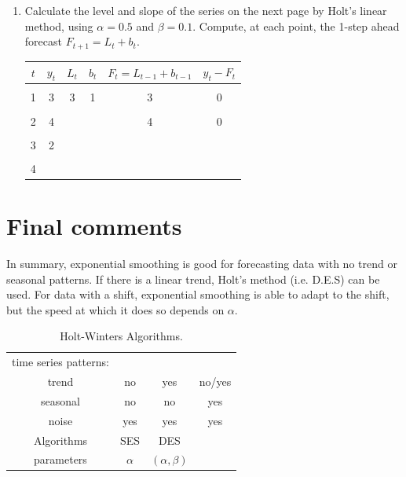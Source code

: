 \documentclass[a4paper,11pt,oneside,onecolumn]{book}
\begin{document}
\begin{enumerate}
\item Calculate the level and slope of the series on
the next page by Holt's linear method, using $\alpha = 0.5$ and
$\beta = 0.1$. Compute, at each point, the 1-step ahead forecast
$F_{t+1} = L_t + b_t$.

\begin{center}
\begin{tabular}{|c|c|cc|cc|}
\multicolumn{1}{|c|}{$t$} & \multicolumn{1}{c|}{$y_t$} &
\multicolumn{1}{p{3cm}}{\hspace{1.2cm}$L_t$} &
\multicolumn{1}{p{2cm}|}{\hspace{.6cm}$b_t$} &
\multicolumn{1}{p{3cm}}{\hspace{.5cm}$F_{t} = L_{t-1}+b_{t-1}$} &
\multicolumn{1}{p{2cm}|}{\hspace{.3cm} $y_t - F_t$} \\
\hline
  &       &   &   &   &   \\
1 & 3     & 3 & 1 & 3 & 0 \\
  &       &   &   &   &   \\
2 & 4     &   &   & 4 & 0  \\
  &       &   &   &   &   \\
3 & 2     &   &   &   &   \\
  &       &   &   &   &   \\
4 &       &   &   &   & \end{tabular}
\end{center}



\end{enumerate}



\section{Final comments}

In summary, exponential smoothing is good for forecasting data with
no trend or seasonal patterns. If there is a linear trend, Holt's
method (i.e. D.E.S) can be used. For data with a shift, exponential smoothing is able to adapt to the shift, but the speed at which it does so depends on $\alpha$.


\begin{table}[!h]
\begin{center}
\begin{tabular}{c|ccc}
\hline
\hline
time series patterns:&  & & \\
trend& no & yes & no/yes\\
seasonal &no &no&yes\\
noise & yes & yes &yes\\
\hline
Algorithms & SES & DES  & \\
\hline
parameters& $\alpha$ & $(\alpha,\beta)$ &\\
\hline
\hline
\end{tabular}
\caption{Holt-Winters Algorithms.}
\end{center}
\end{table}
\end{document}
